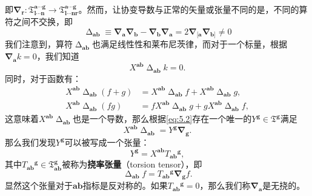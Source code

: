 即$\boldsymbol{\nabla }_{\boldsymbol{r}} :\mathfrak{T}_{\boldsymbol{l} \cdots \boldsymbol{n}}^{\boldsymbol{a} \cdots \boldsymbol{g}}\rightarrow \mathfrak{T}_{\boldsymbol{l} \cdots \boldsymbol{nr}}^{\boldsymbol{a} \cdots \boldsymbol{g}}$。然而，让协变导数与正常的矢量或张量不同的是，不同的算符之间不交换，即
\begin{equation}
	\upDelta _{\boldsymbol{ab}} \equiv \boldsymbol{\nabla }_{\boldsymbol{a}}\boldsymbol{\nabla }_{\boldsymbol{b}} -\boldsymbol{\nabla }_{\boldsymbol{b}}\boldsymbol{\nabla }_{\boldsymbol{a}} =2\boldsymbol{\nabla }_{[\boldsymbol{a}}\boldsymbol{\nabla }_{\boldsymbol{b}]} \neq 0
	\label{eq:5.3}
\end{equation}
我们注意到，算符$\upDelta _{\boldsymbol{ab}}$也满足线性性和莱布尼茨律，而对于一个标量，根据$\boldsymbol{\nabla }_{\boldsymbol{a}} k=0$，我们知道
\begin{equation*}
	X^{\boldsymbol{ab}} \upDelta _{\boldsymbol{ab}} k=0.
\end{equation*}
同时，对于函数有：
\begin{equation*}
	\begin{aligned}
		X^{\boldsymbol{ab}} \upDelta _{\boldsymbol{ab}}( f+g) & =X^{\boldsymbol{ab}} \upDelta _{\boldsymbol{ab}} f+X^{\boldsymbol{ab}} \upDelta _{\boldsymbol{ab}} g,\\
		X^{\boldsymbol{ab}} \upDelta _{\boldsymbol{ab}}( fg) & =fX^{\boldsymbol{ab}} \upDelta _{\boldsymbol{ab}} g+gX^{\boldsymbol{ab}} \upDelta _{\boldsymbol{ab}} f,
	\end{aligned}
\end{equation*}
这意味着$X^{\boldsymbol{ab}} \upDelta _{\boldsymbol{ab}}$也是一个导数，那么根据\ref{eq:5.2}存在一个唯一的$Y^{\boldsymbol{g}} \in \mathfrak{T}^{\boldsymbol{g}}$满足
\begin{equation*}
	X^{\boldsymbol{ab}} \upDelta _{\boldsymbol{ab}} =Y^{\boldsymbol{g}}\boldsymbol{\nabla }_{\boldsymbol{g}} .
\end{equation*}
那么我们发现$Y^{\boldsymbol{g}}$可以被写成一个张量：
\begin{equation*}
	Y^{\boldsymbol{g}} =X^{\boldsymbol{ab}} T{_{\boldsymbol{ab}}}^{\boldsymbol{g}} ,
\end{equation*}
其中$T{_{\boldsymbol{ab}}}^{\boldsymbol{g}} \in \mathfrak{T}_{\boldsymbol{ab}}^{\boldsymbol{g}}$被称为\textbf{挠率张量}（torsion tensor），即
\begin{equation*}
	\upDelta _{\boldsymbol{ab}} f=T{_{\boldsymbol{ab}}}^{\boldsymbol{g}}\boldsymbol{\nabla }_{\boldsymbol{g}} f.
\end{equation*}
显然这个张量对于$\boldsymbol{ab}$指标是反对称的。如果$T{_{\boldsymbol{ab}}}^{\boldsymbol{g}} =0$，那么我们称$\boldsymbol{\nabla }_{\boldsymbol{a}}$是无挠的。



